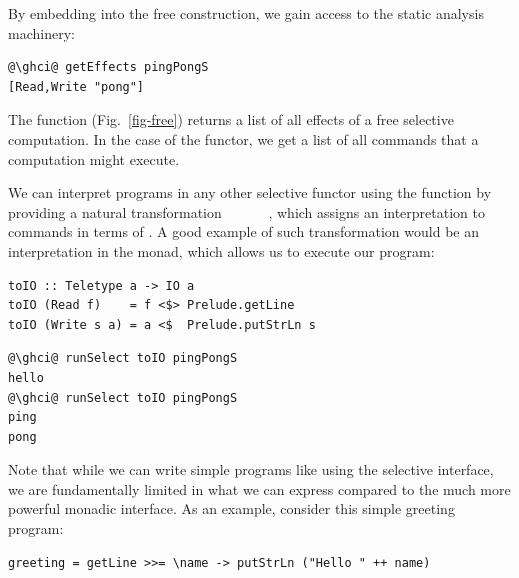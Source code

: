 \noindent
By embedding  into the free construction, we gain access to the
static analysis machinery:

\vspace{1mm}
\begin{verbatim}
@\ghci@ getEffects pingPongS
[Read,Write "pong"]
\end{verbatim}
\vspace{1mm}

\noindent
The  function (Fig.~\ref{fig-free}) returns a list of all effects
of a free selective computation. In the case of the  functor, we
get a list of all commands that a computation might execute.


We can interpret  programs in any other selective functor using
the  function by providing a natural transformation
~~~~\hs{->}~~, which assigns an
interpretation to  commands in terms of . A good example of
such transformation would be an interpretation in the  monad, which
allows us to execute our  program:

\vspace{1mm}
\begin{verbatim}
toIO :: Teletype a -> IO a
toIO (Read f)    = f <$> Prelude.getLine
toIO (Write s a) = a <$  Prelude.putStrLn s
\end{verbatim}
\vspace{0mm}
\begin{verbatim}
@\ghci@ runSelect toIO pingPongS
hello
@\ghci@ runSelect toIO pingPongS
ping
pong
\end{verbatim}
\vspace{1mm}

\noindent
Note that while we can write simple programs like  using the
selective interface, we are fundamentally limited in what we can express
compared to the much more powerful monadic interface. As an example, consider
this simple greeting program:

\vspace{1mm}
\begin{verbatim}
greeting = getLine >>= \name -> putStrLn ("Hello " ++ name)
\end{verbatim}
\vspace{1mm}

